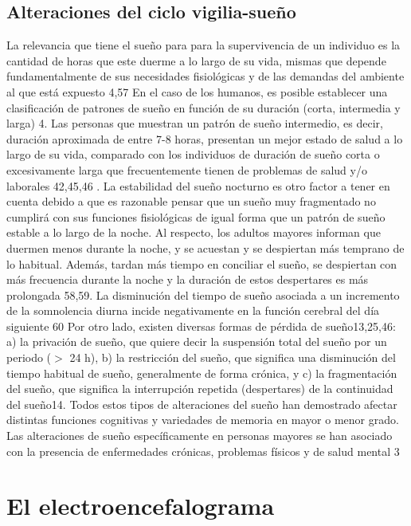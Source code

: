 
\subsection{Alteraciones del ciclo vigilia-sueño}

La relevancia que tiene el sueño para para la supervivencia de un individuo es la cantidad de horas que este duerme a lo largo de su vida, mismas que depende fundamentalmente de sus necesidades fisiológicas y de las demandas del ambiente al que está expuesto 4,57
 En el caso de los humanos, es posible establecer una clasificación de patrones de sueño en función de su duración (corta, intermedia y larga) 4. Las personas que muestran un patrón de sueño intermedio, es decir, duración aproximada de entre 7-8 horas, presentan un mejor estado de salud a lo largo de su vida, comparado con los individuos de duración de sueño corta o excesivamente larga que frecuentemente tienen de problemas de salud y/o laborales 42,45,46 . 
La estabilidad del sueño nocturno es otro factor a tener en cuenta debido a que es razonable pensar que un sueño muy fragmentado no cumplirá con sus funciones fisiológicas de igual forma que un patrón de sueño estable a lo largo de la noche. Al respecto, los adultos mayores informan que duermen menos durante la noche, y se acuestan y se despiertan más temprano de lo habitual. Además, tardan más tiempo en conciliar el sueño, se despiertan con más frecuencia durante la noche y la duración de estos despertares es más prolongada 58,59.
La disminución del tiempo de sueño asociada a un incremento de la somnolencia diurna incide negativamente en la función cerebral del día siguiente 60
Por otro lado, existen diversas formas de pérdida de sueño13,25,46: a) la privación de sueño, que quiere decir la suspensión total del sueño por un periodo ($>$ 24 h), b) la restricción del sueño, que significa una disminución del tiempo habitual de sueño, generalmente de forma crónica, y c) la fragmentación del sueño, que significa la interrupción repetida (despertares) de la continuidad del sueño14. Todos estos tipos de alteraciones del sueño han demostrado afectar distintas funciones cognitivas y variedades de memoria en mayor o menor grado.
Las alteraciones de sueño específicamente en personas mayores se han asociado con la presencia de enfermedades crónicas, problemas físicos y de salud mental 3

\section{El electroencefalograma}

